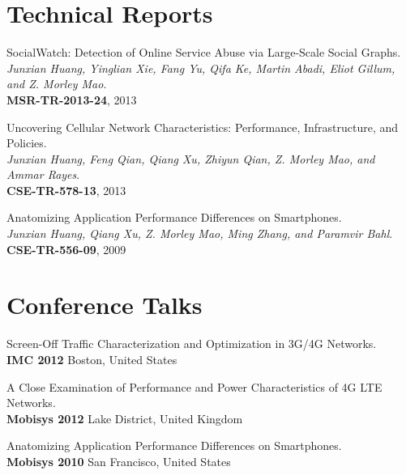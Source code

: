 \documentclass[letterpaper]{article}
\renewenvironment{itemize}{
  \begin{list}{}{
    \setlength{\leftmargin}{1em}
  }
}{
  \end{list}
}
\begin{document}
\section*{Technical Reports}
\begin{itemize}
\item {SocialWatch: Detection of Online Service Abuse via Large-Scale Social Graphs.\\
{\em Junxian Huang, Yinglian Xie, Fang Yu, Qifa Ke, Martin Abadi, Eliot Gillum, and Z. Morley Mao}.\\
{\bf MSR-TR-2013-24}, 2013}
 
\item {Uncovering Cellular Network Characteristics: Performance, Infrastructure, and Policies.\\
{\em Junxian Huang, Feng Qian, Qiang Xu, Zhiyun Qian, Z. Morley Mao, and Ammar Rayes}.\\
{\bf CSE-TR-578-13}, 2013}

\item {Anatomizing Application Performance Differences on Smartphones.\\
{\em Junxian Huang, Qiang Xu, Z. Morley Mao, Ming Zhang, and Paramvir Bahl}.\\
{\bf CSE-TR-556-09}, 2009}


\end{itemize}

\section*{Conference Talks}
\begin{itemize}
\item {Screen-Off Traffic Characterization and Optimization in 3G/4G Networks.\\
{\bf IMC 2012} Boston, United States}
\item {A Close Examination of Performance and Power Characteristics of 4G LTE Networks.\\
{\bf Mobisys 2012} Lake District, United Kingdom}
\item {Anatomizing Application Performance Differences on Smartphones.\\
{\bf Mobisys 2010} San Francisco, United States}
\end{itemize}
\end{document}

